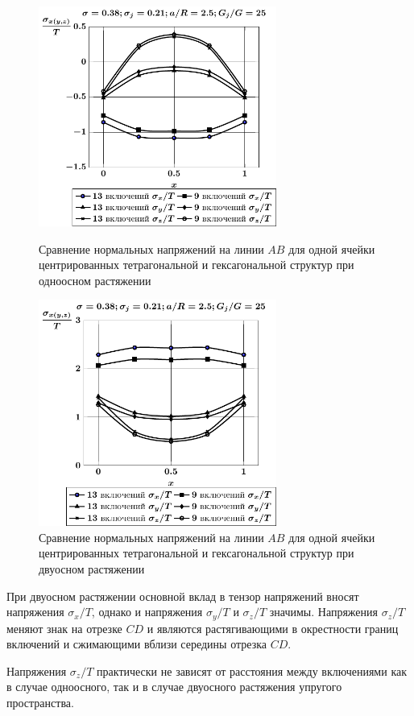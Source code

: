 \begin{figure}[h!]
\centering\footnotesize
\parbox[b]{7.5cm}{\centering\includegraphics[width=7.8cm]{inc13-9-a25-d95-g25-t1.pdf}
\caption{Сравнение нормальных напряжений на линии $AB$ для одной ячейки центрированных тетрагональной и гексагональной структур при одноосном растяжении
\label{f:8:86}}}\hfil\hfil
\parbox[b]{7.5cm}{\centering\includegraphics[width=7.8cm]{inc13-9-a25-d95-g25-t2.pdf}
\caption{Сравнение нормальных напряжений на линии $AB$ для одной ячейки центрированных тетрагональной и гексагональной структур при двуосном растяжении
\label{f:8:87}}}
\end{figure}

При двуосном растяжении основной вклад в тензор напряжений вносят напряжения $\sigma_x/T$, однако и напряжения $\sigma_y/T$ и $\sigma_z/T$ значимы. Напряжения $\sigma_z/T$ меняют знак на отрезке $CD$ и являются растягивающими в окрестности границ включений и сжимающими вблизи середины отрезка $CD$.

Напряжения $\sigma_z/T$ практически не зависят от расстояния между включениями как в случае одноосного, так и в случае двуосного растяжения упругого пространства.

